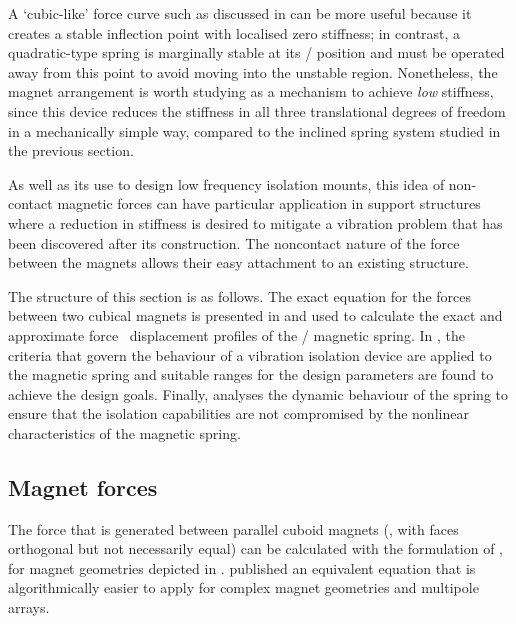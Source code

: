 A `cubic-like' force curve such as discussed in  can be more
useful because it creates a stable inflection point with localised zero
stiffness;  in contrast, a
quadratic-type spring is marginally stable at its \qzs/ position and must be
operated away from this point to avoid moving into the unstable region.
Nonetheless, the magnet arrangement is worth studying as a mechanism to
achieve \emph{low} stiffness, since this device reduces the stiffness in all
three translational degrees of freedom in a mechanically simple way, compared
to the inclined spring system studied in the previous section.

As well as its use to design low frequency isolation mounts, this idea of
non-contact magnetic forces can have particular application in support
structures where a reduction in stiffness is desired to mitigate a vibration
problem that has been discovered after its construction. The noncontact nature
of the force between the magnets allows their easy attachment to an existing
structure.

The structure of this section is as follows. The exact equation for the
forces between two cubical magnets is presented in  and
used to calculate the exact and approximate force \vs\  displacement
profiles of the \qzs/ magnetic spring. In , the
criteria that govern the behaviour of a vibration isolation device
are applied to the magnetic spring and suitable ranges for the
design parameters are found to achieve the design goals.
Finally,  analyses the dynamic behaviour of the spring
to ensure that the isolation capabilities are not compromised by the
nonlinear characteristics of the magnetic spring.


\subsection{Magnet forces}

The force that is generated between parallel cuboid magnets (\ie, with
faces orthogonal but not necessarily equal) can be calculated
with the formulation of \textcite{akoun1984}, for magnet
geometries depicted in . \textcite{bancel1999} published
an equivalent equation that is algorithmically easier to apply for
complex magnet geometries and multipole arrays.

